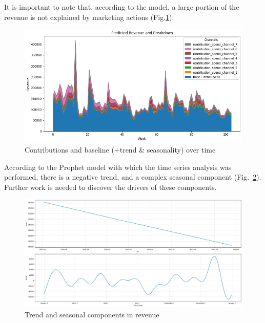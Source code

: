 \documentclass[a4paper,10pt]{scrartcl}
\begin{document}
It is important to note that, according to the model, a large portion of the revenue is not explained by marketing actions (Fig.\ref{f:Conts}).
\begin{figure}[!h]
  \centering
  \includegraphics[trim=0mm 0mm 0mm 0mm, clip, width=.8\textwidth]{contributions_vs_time.png}
  \caption{Contributions and baseline (+trend \& seasonality) over time}\label{f:Conts}
\end{figure}

According to the Prophet model with which the time series analysis was performed, there is a negative trend, and a complex seasonal component (Fig.~\ref{f:TrendSeas}). Further work is needed to discover the drivers of these components.

\begin{figure}[!h]
  \centering
  \includegraphics[trim=0mm 0mm 0mm 0mm, clip, width=.8\textwidth]{trend_and_seasonality.png}
  \caption{Trend and seasonal components in revenue}\label{f:TrendSeas}
\end{figure}



%
%
\end{document}
